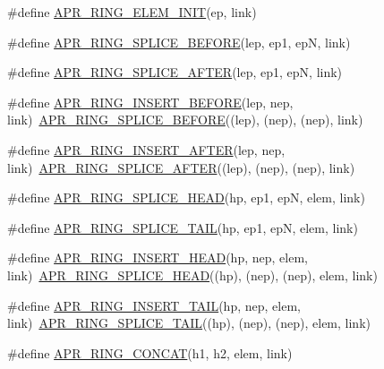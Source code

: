 \begin{DoxyCompactItemize}
\item 
\#define \hyperlink{group__apr__ring_gae5048ecda4b26b012ee93c2c830058cb}{A\+P\+R\+\_\+\+R\+I\+N\+G\+\_\+\+E\+L\+E\+M\+\_\+\+I\+N\+IT}(ep,  link)
\item 
\#define \hyperlink{group__apr__ring_ga438e7369e650ee07ac98ed0731589750}{A\+P\+R\+\_\+\+R\+I\+N\+G\+\_\+\+S\+P\+L\+I\+C\+E\+\_\+\+B\+E\+F\+O\+RE}(lep,  ep1,  epN,  link)
\item 
\#define \hyperlink{group__apr__ring_ga53e6564eba59d7e734a0ce03cb418a42}{A\+P\+R\+\_\+\+R\+I\+N\+G\+\_\+\+S\+P\+L\+I\+C\+E\+\_\+\+A\+F\+T\+ER}(lep,  ep1,  epN,  link)
\item 
\#define \hyperlink{group__apr__ring_ga76f9a04f932b3377073fa4e30d745564}{A\+P\+R\+\_\+\+R\+I\+N\+G\+\_\+\+I\+N\+S\+E\+R\+T\+\_\+\+B\+E\+F\+O\+RE}(lep,  nep,  link)~\hyperlink{group__apr__ring_ga438e7369e650ee07ac98ed0731589750}{A\+P\+R\+\_\+\+R\+I\+N\+G\+\_\+\+S\+P\+L\+I\+C\+E\+\_\+\+B\+E\+F\+O\+RE}((lep), (nep), (nep), link)
\item 
\#define \hyperlink{group__apr__ring_ga40453637d00c853f3a212a30c1f2cb41}{A\+P\+R\+\_\+\+R\+I\+N\+G\+\_\+\+I\+N\+S\+E\+R\+T\+\_\+\+A\+F\+T\+ER}(lep,  nep,  link)~\hyperlink{group__apr__ring_ga53e6564eba59d7e734a0ce03cb418a42}{A\+P\+R\+\_\+\+R\+I\+N\+G\+\_\+\+S\+P\+L\+I\+C\+E\+\_\+\+A\+F\+T\+ER}((lep), (nep), (nep), link)
\item 
\#define \hyperlink{group__apr__ring_ga592e71a7cf219fc70f4fc47c60ef4c64}{A\+P\+R\+\_\+\+R\+I\+N\+G\+\_\+\+S\+P\+L\+I\+C\+E\+\_\+\+H\+E\+AD}(hp,  ep1,  epN,  elem,  link)
\item 
\#define \hyperlink{group__apr__ring_ga51e02e214fb6e218f45ff23cbd1f7abc}{A\+P\+R\+\_\+\+R\+I\+N\+G\+\_\+\+S\+P\+L\+I\+C\+E\+\_\+\+T\+A\+IL}(hp,  ep1,  epN,  elem,  link)
\item 
\#define \hyperlink{group__apr__ring_gad59352546dc9253c0057ad43cf728a63}{A\+P\+R\+\_\+\+R\+I\+N\+G\+\_\+\+I\+N\+S\+E\+R\+T\+\_\+\+H\+E\+AD}(hp,  nep,  elem,  link)~\hyperlink{group__apr__ring_ga592e71a7cf219fc70f4fc47c60ef4c64}{A\+P\+R\+\_\+\+R\+I\+N\+G\+\_\+\+S\+P\+L\+I\+C\+E\+\_\+\+H\+E\+AD}((hp), (nep), (nep), elem, link)
\item 
\#define \hyperlink{group__apr__ring_ga235311035184125d72ce0689c9949a3e}{A\+P\+R\+\_\+\+R\+I\+N\+G\+\_\+\+I\+N\+S\+E\+R\+T\+\_\+\+T\+A\+IL}(hp,  nep,  elem,  link)~\hyperlink{group__apr__ring_ga51e02e214fb6e218f45ff23cbd1f7abc}{A\+P\+R\+\_\+\+R\+I\+N\+G\+\_\+\+S\+P\+L\+I\+C\+E\+\_\+\+T\+A\+IL}((hp), (nep), (nep), elem, link)
\item 
\#define \hyperlink{group__apr__ring_ga34ee7a0d6daa61117006bb74498ff5aa}{A\+P\+R\+\_\+\+R\+I\+N\+G\+\_\+\+C\+O\+N\+C\+AT}(h1,  h2,  elem,  link)

\end{DoxyCompactItemize}
